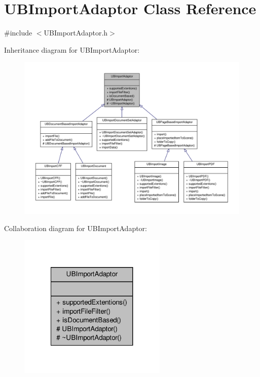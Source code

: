 \hypertarget{class_u_b_import_adaptor}{\section{U\-B\-Import\-Adaptor Class Reference}
\label{d1/da5/class_u_b_import_adaptor}
}


{\ttfamily \#include $<$U\-B\-Import\-Adaptor.\-h$>$}



Inheritance diagram for U\-B\-Import\-Adaptor\-:
\nopagebreak
\begin{figure}[H]
\begin{center}
\leavevmode
\includegraphics[width=350pt]{d7/de7/class_u_b_import_adaptor__inherit__graph}
\end{center}
\end{figure}


Collaboration diagram for U\-B\-Import\-Adaptor\-:
\nopagebreak
\begin{figure}[H]
\begin{center}
\leavevmode
\includegraphics[width=200pt]{de/dad/class_u_b_import_adaptor__coll__graph}
\end{center}
\end{figure}
